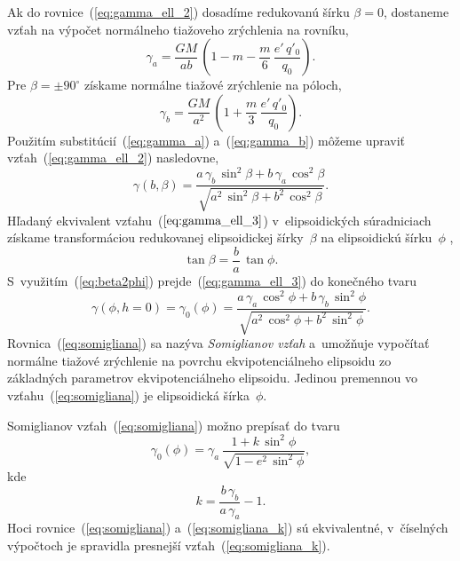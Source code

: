 \documentclass[a4paper,12pt]{book}
\begin{document}
Ak do rovnice~(\ref{eq:gamma_ell_2}) dosadíme redukovanú šírku $\beta = 0$, 
dostaneme vzťah na výpočet normálneho tiažoveho zrýchlenia na rovníku,
%
\begin{equation}
\label{eq:gamma_a}
\gamma_a = \frac{GM}{ab} \, \left( 1 - m - \frac{m}{6} \, \frac{e' \, 
q'_0}{q_0} \right){.}
\end{equation}
%
Pre $\beta = \pm 90^\circ$ získame normálne tiažové zrýchlenie na póloch,
%
\begin{equation}
\label{eq:gamma_b}
\gamma_b = \frac{GM}{a^2} \, \left( 1 + \frac{m}{3} \, \frac{e' \, q'_0}{q_0} 
\right){.}
\end{equation}
%
Použitím substitúcií~(\ref{eq:gamma_a}) a~(\ref{eq:gamma_b}) môžeme upraviť 
vzťah~(\ref{eq:gamma_ell_2}) nasledovne,
%
\begin{equation}
\label{eq:gamma_ell_3}
\gamma(b, \beta) = \frac{a \, \gamma_b \, \sin^2\beta + b \, \gamma_a \, 
\cos^2\beta}{\sqrt{a^2 \, \sin^2\beta + b^2 \, \cos^2\beta}}{.}
\end{equation}
%
Hľadaný ekvivalent vzťahu~($\ref{eq:gamma_ell_3}$) v~elipsoidických 
súradniciach získame transformáciou redukovanej elipsoidickej šírky~$\beta$ na 
elipsoidickú šírku~$\phi$ \parencite[napríklad][]{MoritzPhysicalGeodesy},
%
\begin{equation}
\label{eq:beta2phi}
\tan \beta = \frac{b}{a} \, \tan\phi{.}
\end{equation}
%
S~využitím~(\ref{eq:beta2phi}) prejde~(\ref{eq:gamma_ell_3}) do konečného tvaru
%
\begin{equation}
\label{eq:somigliana}
\gamma(\phi, h = 0) = \gamma_0(\phi) = \frac{a \, \gamma_a \, \cos^2\phi + b \, 
\gamma_b \, \sin^2\phi}{\sqrt{a^2 \, \cos^2\phi + b^2 \, \sin^2\phi}}{.}
\end{equation}
%
Rovnica~(\ref{eq:somigliana}) sa nazýva \emph{Somiglianov vzťah} a~umožňuje 
vypočítať normálne tiažové zrýchlenie na povrchu ekvipotenciálneho elipsoidu zo 
základných parametrov ekvipotenciálneho elipsoidu.  Jedinou premennou vo 
vzťahu~(\ref{eq:somigliana}) je elipsoidická šírka~$\phi$.

Somiglianov vzťah~(\ref{eq:somigliana}) možno prepísať do tvaru 
\parencite{GRS80}
%
\begin{equation}
\label{eq:somigliana_k}
\gamma_0(\phi) = \gamma_a \, \frac{1 + k \, \sin^2\phi}{\sqrt{1 - e^2 \, 
\sin^2\phi}}{,}
\end{equation}
%
kde
%
\begin{equation}
k = \frac{b \, \gamma_b}{a \, \gamma_a} - 1{.}
\end{equation}
%
Hoci rovnice~(\ref{eq:somigliana}) a~(\ref{eq:somigliana_k}) sú ekvivalentné, 
v~číselných výpočtoch je spravidla presnejší vzťah~(\ref{eq:somigliana_k}).
\end{document}
